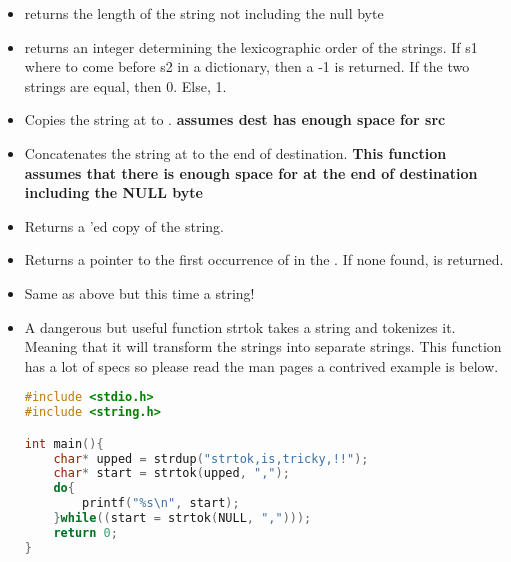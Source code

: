 \begin{itemize}

\item {} returns the length of the string not including the null byte

\item {} returns an integer determining the lexicographic order of the strings. If s1 where to come before s2 in a dictionary, then a -1 is returned. If the two strings are equal, then 0. Else, 1.

\item {} Copies the string at  to . \textbf{assumes dest has enough space for src}

\item {} Concatenates the string at  to the end of destination. \textbf{This function assumes that there is enough space for  at the end of destination including the NULL byte}

\item {} Returns a 'ed copy of the string.

\item {} Returns a pointer to the first occurrence of  in the . If none found,  is returned.

\item {} Same as above but this time a string!

\item {}

 A dangerous but useful function strtok takes a string and tokenizes it. Meaning that it will transform the strings into separate strings. This function has a lot of specs so please read the man pages a contrived example is below.

\begin{lstlisting}[language=C]
#include <stdio.h>
#include <string.h>

int main(){
    char* upped = strdup("strtok,is,tricky,!!");
    char* start = strtok(upped, ",");
    do{
        printf("%s\n", start);
    }while((start = strtok(NULL, ",")));
    return 0;
}
\end{lstlisting}


\end{itemize}
